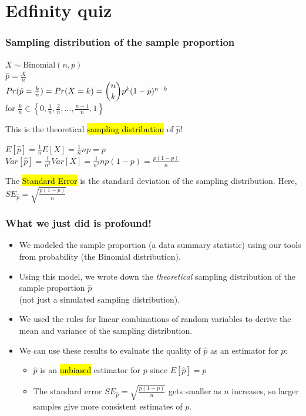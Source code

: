 \documentclass[t,compress,mathserif]{beamer}
\newcommand{\soln}[1]{\textit{#1}}
\begin{document}
\section{Edfinity quiz}


\begin{frame}
\frametitle{Sampling distribution of the sample proportion}

$X \sim \text{Binomial}(n, p)$ \\
$\hat{p}  = \frac{X}{n}$ \\

\vspace{1em}
\textcolor{orange}{$Pr(\hat{p}  = \frac{k}{n}) = Pr(X = k) = \dbinom{n}{k} p^k (1-p)^{n-k}$} \\
for $\frac{k}{n} \in \left\{0, \frac{1}{n}, \frac{2}{n}, \ldots, \frac{n-1}{n}, 1\right\}$


This is the theoretical \hl{sampling distribution} of $\hat{p}$!
\vspace{1em}

\soln{
$E[\hat{p}] = \frac{1}{n}E[X] = \frac{1}{n}np = p$\\
$Var[\hat{p}] = \frac{1}{n^2}Var[X] = \frac{1}{n^2}np(1-p) = \frac{p(1-p)}{n}$
}
\pause

\vspace{1em}
The \hl{Standard Error} is the standard deviation of the sampling distribution. Here, $SE_{\hat{p}} = \sqrt{\frac{p(1-p)}{n}}$
\end{frame}

\begin{frame}
\frametitle{What we just did is profound!}
\begin{itemize}
    \item We modeled the sample proportion (a data summary statistic) using our tools from probability (the Binomial distribution).
    \pause
    \item Using this model, we wrote down the \emph{theoretical} sampling distribution of the sample proportion $\hat{p}$ \\
    (not just a simulated sampling distribution).
    \pause
    \item We used the rules for linear combinations of random variables to derive the mean and variance of the sampling distribution.
    \pause
    \item We can use these results to evaluate the quality of $\hat{p}$ as an estimator for $p$:
    \begin{itemize}
        \item $\hat{p}$ is an \hl{unbiased} estimator for $p$ since $E[\hat{p}] = p$
        \item The standard error $SE_{\hat{p}} = \sqrt{\frac{p(1-p)}{n}}$ gets smaller as $n$ increases, so larger samples give more consistent estimates of $p$.
    \end{itemize}
\end{itemize}
\end{frame}
\end{document}
